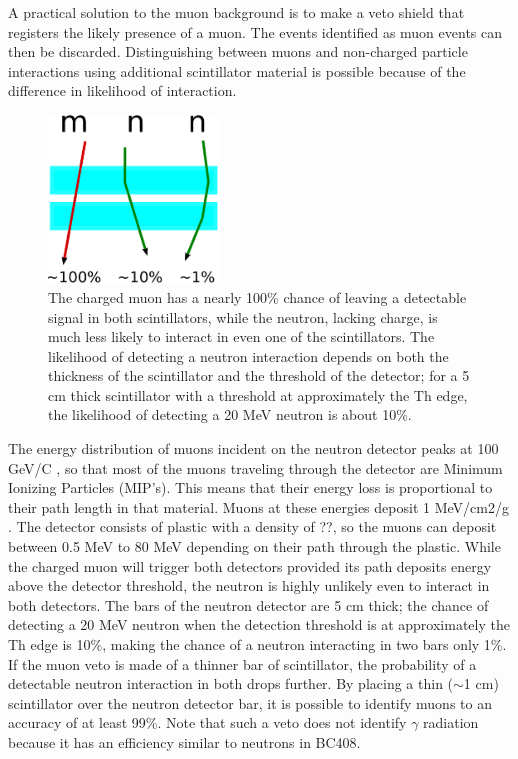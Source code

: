 A practical solution to the muon background is to make a veto shield that registers the likely presence of a muon.  The events identified as muon events can then be discarded.  Distinguishing between muons and non-charged particle interactions using additional scintillator material is possible because of the difference in likelihood of interaction.  
\begin{figure}[hp]
\centering
\includegraphics[width=0.4\textwidth]{figures/simpleVeto.eps}
\caption{The charged muon has a nearly 100\% chance of leaving a detectable signal in both scintillators, while the neutron, lacking charge, is much less likely to interact in even one of the scintillators.  The likelihood of detecting a neutron interaction depends on both the thickness of the scintillator and the threshold of the detector; for a 5 cm thick scintillator with a threshold at approximately the Th edge, the likelihood of detecting a 20 MeV neutron is about 10\%.}
\label{fig:simpleVeto}
\end{figure}
The energy distribution of muons incident on the neutron detector peaks at 100 GeV/C \cite{PDG}, so that most of the muons traveling through the detector are Minimum Ionizing Particles (MIP's).  This means that their energy loss is proportional to their path length in that material.  Muons at these energies deposit 1 MeV/cm2/g \cite{PDG}.  The detector consists of plastic with a density of ??, so the muons can deposit between 0.5 MeV to 80 MeV depending on their path through the plastic.  While the charged muon will trigger both detectors provided its path deposits energy above the detector threshold, the neutron is highly unlikely even to interact in both detectors.  The bars of the neutron detector are 5 cm thick; the chance of detecting a 20 MeV neutron when the detection threshold is at approximately the Th edge is 10\%, making the chance of a neutron interacting in two bars only 1\%.  If the muon veto is made of a thinner bar of scintillator, the probability of a detectable neutron interaction in both drops further.  By placing a thin ($\sim$1 cm) scintillator over the neutron detector bar, it is possible to identify muons to an accuracy of at least 99\%.  Note that such a veto does not identify $\gamma$ radiation because it has an efficiency similar to neutrons in BC408.

